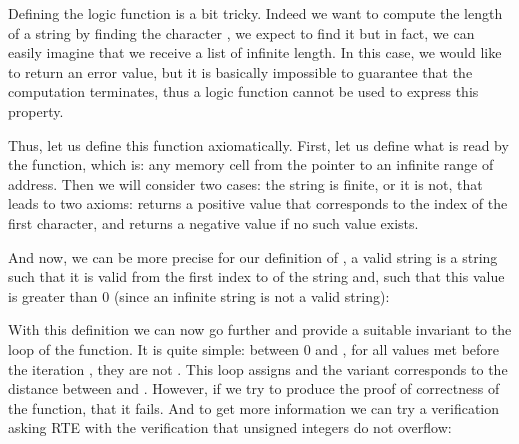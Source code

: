 


Defining the logic function  is a bit tricky. Indeed
we want to compute the length of a string by finding the character
, we expect to find it but in fact, we
can easily imagine that we receive a list of infinite length. In this case,
we would like to return an error value, but it is basically impossible to
guarantee that the computation terminates, thus a logic function cannot
be used to express this property.



Thus, let us define this function axiomatically. First, let us define what
is read by the function, which is: any memory cell from the pointer to an
infinite range of address. Then we will consider two cases: the string is
finite, or it is not, that leads to two axioms:  returns
a positive value that corresponds to the index of the first
 character, and returns a negative value if
no such value exists.






And now, we can be more precise for our definition of
, a valid string is a
string such that it is valid from the first index to 
of the string and, such that this value is greater than 0 (since an
infinite string is not a valid string):








With this definition we can now go further and provide a suitable
invariant to the loop of the  function. It is quite
simple:  between 0 and , for
all values met before the iteration , they are not
. This loop assigns  and
the variant corresponds to the distance between  and
. However, if we try to produce the proof of
correctness of the function, that it fails. And to get more information
we can try a verification asking RTE with the verification that unsigned
integers do not overflow:







